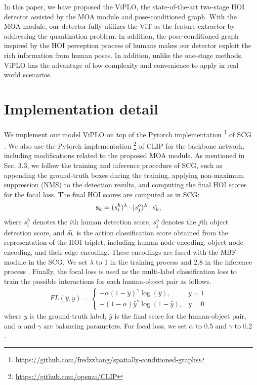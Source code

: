 \documentclass[10pt,twocolumn,letterpaper]{article}
\begin{document}
In this paper, we have proposed the ViPLO, the state-of-the-art two-stage HOI detector assisted by the MOA module and pose-conditioned graph. With the MOA module, our detector fully utilizes the ViT as the feature extractor by addressing the quantization problem. In addition, the pose-conditioned graph inspired by the HOI perception process of humans makes our detector exploit the rich information from human poses. In addition, unlike the one-stage methods, ViPLO has the advantage of low complexity and convenience to apply in real world scenarios.


{\small


}

\clearpage

\appendix



\section{Implementation detail}
\label{app:a}
We implement our model ViPLO on top of the Pytorch implementation \footnote{\url{https://github.com/fredzzhang/spatially-conditioned-graphs}} of SCG\cite{zhang2021spatially} . We also use the Pytorch implementation \footnote{\url{https://github.com/openai/CLIP}} of CLIP \cite{radford2021learning} for the backbone network, including modifications related to the proposed MOA module. As mentioned in Sec. 3.3, we follow the training and inference procedure of SCG, such as appending the ground-truth boxes during the training, applying non-maximum suppression (NMS) to the detection results, and computing the final HOI scores for the focal loss. The final HOI scores are computed as in SCG: 
\begin{align}
    \label{eq:1}
    \mathbf{s}_{k} = (s^{h}_{i})^{\lambda} \cdot (s^{o}_{j})^{\lambda} \cdot \Tilde{s_{k}}, 
\end{align}
where $s^{h}_{i}$ denotes the $i$th human detection score, $s^{o}_{j}$ denotes the $j$th object detection score, and $\Tilde{s_{k}}$ is the action classification score obtained from the representation of the HOI triplet, including human node encoding, object node encoding, and their edge encoding. These encodings are fused with the MBF module in the SCG. We set $\lambda$ to 1 in the training process and 2.8 in the inference process \cite{zhang2021spatially}.
Finally, the focal loss \cite{lin2017focal} is used as the multi-label classification loss to train the possible interactions for each human-object pair as follows.
\begin{align}
    \label{eq:6}
    FL(\hat{y}, y) = \begin{cases}
      -\alpha(1-\hat{\mathit{y}})^{\gamma}\log(\hat{\mathit{y}}), & y = 1\\
      -(1-\alpha)\hat{\mathit{y}}^{\gamma}\log(1-\hat{\mathit{y}}), & y = 0
    \end{cases}
\end{align}
where $\mathit{y}$ is the ground-truth label, $\hat{\mathit{y}}$ is the final score for the human-object pair, and $\alpha$ and $\gamma$ are balancing parameters.
For focal loss, we set $\alpha$ to 0.5 and $\gamma$ to 0.2 \cite{zhang2021spatially}. 
\end{document}
